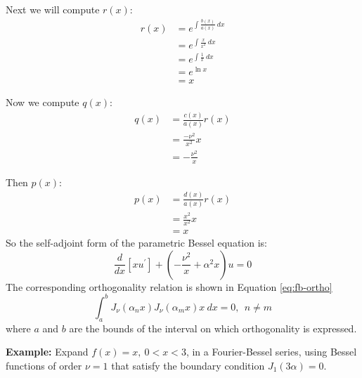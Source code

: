 \vspace{0.25cm}

\noindent Next we will compute $r(x)$:
\begin{align*}
r(x) &= e^{\int \frac{b(x)}{a(x)} \ dx} \\
&= e^{\int \frac{x}{x^2} \ dx} \\
&= e^{\int \frac{1}{x} \ dx} \\
&= e^{\ln{x}} \\
&= x
\end{align*}

\vspace{0.25cm}

\noindent Now we compute $q(x)$:
\begin{align*}
q(x) &= \frac{c(x)}{a(x)}r(x) \\
&= \frac{-\nu^2}{x^2}x \\
&= -\frac{\nu^2}{x}
\end{align*}

\vspace{0.25cm}

\noindent Then $p(x)$:
\begin{align*}
p(x) &= \frac{d(x)}{a(x)}r(x) \\
&=\frac{x^2}{x^2}x \\
&= x
\end{align*}
So the self-adjoint form of the parametric Bessel equation is:
\begin{equation*}
\frac{d}{dx}\left[x u^{\prime} \right] + \left(-\frac{\nu^2}{x} + \alpha^2 x \right)u = 0
\end{equation*}
The corresponding orthogonality relation is shown in Equation \ref{eq:fb-ortho}
\begin{equation}
\int_{a}^{b}J_{\nu}(\alpha_n x) J_{\nu}(\alpha_m x) x \ dx = 0, \ \ n \ne m
\label{eq:fb-ortho}
\end{equation}
where $a$ and $b$ are the bounds of the interval on which orthogonality is expressed.

\vspace{0.5cm}

\noindent\textbf{Example:} Expand $f(x)=x, \ 0<x<3$, in a Fourier-Bessel series, using Bessel functions of order $\nu=1$ that satisfy the boundary condition $J_{1}(3\alpha)=0.$

